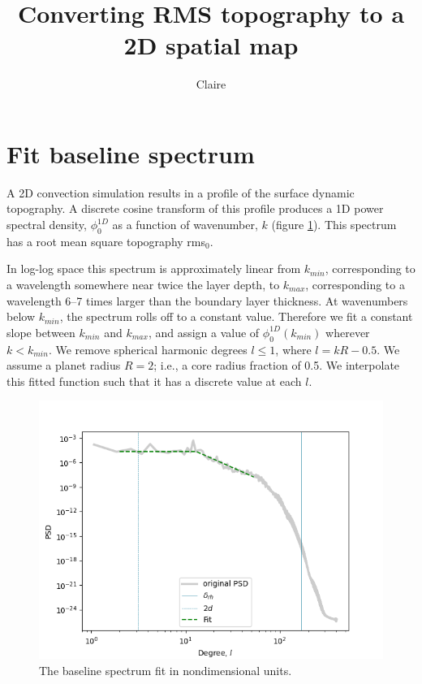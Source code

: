 \documentclass[10pt]{article}
\title{Converting RMS topography to a 2D spatial map}
\author{Claire}
\begin{document}
\maketitle

\section{Fit baseline spectrum}

A 2D convection simulation results in a profile of the surface dynamic topography. A discrete cosine transform of this profile produces a 1D power spectral density, $\phi^{1D}_0$ as a function of wavenumber, $k$ (figure \ref{fig:aspect_spectrum}). This spectrum has a root mean square topography rms$_0$.

In log-log space this spectrum is approximately linear from $k_{min}$, corresponding to a wavelength somewhere near twice the layer depth, to $k_{max}$, corresponding to a wavelength 6--7 times larger than the boundary layer thickness. At wavenumbers below $k_{min}$, the spectrum rolls off to a constant value. Therefore we fit a constant slope between $k_{min}$ and $k_{max}$, and assign a value of $\phi^{1D}_0(k_{min})$ wherever $k < k_{min}$. We remove spherical harmonic degrees $l \le 1$, where $l = kR - 0.5$. We assume a planet radius $R = 2$; i.e., a core radius fraction of 0.5. We interpolate this fitted function such that it has a discrete value at each $l$.

\begin{figure}[h]
\centering\includegraphics[width=1\linewidth]{fit.png}
\caption{The baseline spectrum fit in nondimensional units. \label{fig:aspect_spectrum}}
\end{figure}
\end{document}
